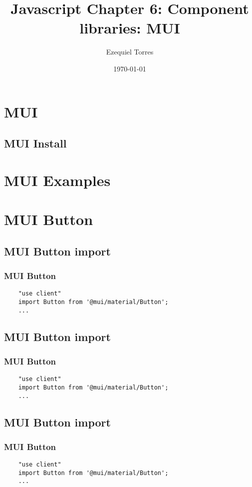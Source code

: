 \documentclass{beamer}
\begin{document}
\title{Javascript Chapter 6: Component libraries: MUI}
\author{Ezequiel Torres}
\date{\today}
\frame{\titlepage}

\section{MUI}

\subsection{MUI Install}

\section{MUI Examples}

\section{MUI Button}
\subsection{MUI Button import}
\begin{frame}[fragile]
\frametitle{MUI Button}
\begin{lstlisting}
    "use client"
    import Button from '@mui/material/Button';
    ...
\end{lstlisting}
\end{frame}

\subsection{MUI Button import}
\begin{frame}[fragile]
\frametitle{MUI Button}
\begin{lstlisting}
    "use client"
    import Button from '@mui/material/Button';
    ...
\end{lstlisting}
\end{frame}

\subsection{MUI Button import}
\begin{frame}[fragile]
\frametitle{MUI Button}
\begin{lstlisting}
    "use client"
    import Button from '@mui/material/Button';
    ...
\end{lstlisting}
\end{frame}
\end{document}
